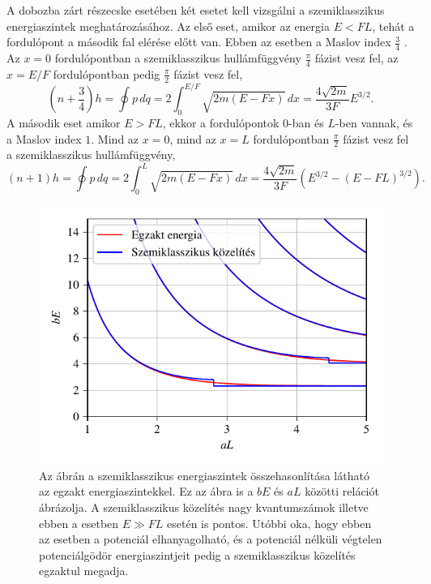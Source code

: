 A dobozba zárt részecske esetében két esetet kell vizsgálni a szemiklasszikus energiaszintek meghatározásához. Az első eset, amikor az energia $E < FL$, tehát a fordulópont a második fal elérése előtt van. Ebben az esetben a Maslov index $\frac{3}{4}$ \cite[2.4.1 fejezet]{brack:semiclassical}. Az $x=0$ fordulópontban a szemiklasszikus hullámfüggvény $\frac{\pi}{4}$ fázist vesz fel, az $x=E/F$ fordulópontban pedig $\frac{\pi}{2}$ fázist vesz fel,
\begin{equation}
	\left(n+\frac{3}{4}\right)h=\oint p\,dq=2\int_0^{E/F}\sqrt{2m\left( E-Fx \right)}\,dx=\frac{4\sqrt{2m}}{3F}E^{3/2}.
	\label{semiclassicallevels:e1}
\end{equation}
A második eset amikor $E > FL$, ekkor a fordulópontok $0$-ban és $L$-ben vannak, és a Maslov index $1$. Mind az $x=0$, mind az $x=L$ fordulópontban $\frac{\pi}{2}$ fázist vesz fel a szemiklasszikus hullámfüggvény,
\begin{equation}
	\left(n+1\right)h=\oint p\,dq=2\int_0^{L}\sqrt{2m\left(E-Fx\right)}\,dx=\frac{4\sqrt{2m}}{3F}\left(E^{3/2}-\left(E-FL\right)^{3/2}\right).
	\label{semiclassicallevels:e2}
\end{equation}
\begin{figure}[H]
	\centering
	\includegraphics[scale=1]{./figs/energiaszintkozelites.pdf}
	\caption[Szemiklasszikus energiaszintek]{Az ábrán a szemiklasszikus energiaszintek összehasonlítása látható az egzakt energiaszintekkel. Ez az ábra is a $bE$ és $aL$ közötti relációt ábrázolja. A szemiklasszikus közelítés nagy kvantumszámok illetve ebben a esetben $E \gg FL$ esetén is pontos. Utóbbi oka, hogy ebben az esetben a potenciál elhanyagolható, és a potenciál nélküli végtelen potenciálgödör energiaszintjeit pedig a szemiklasszikus közelítés egzaktul megadja.}
	\label{semiclassicallevels:kozelites}
\end{figure}
